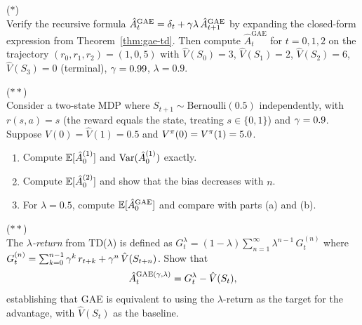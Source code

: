 \documentclass[11pt,a4paper]{article}
\begin{document}
\begin{exercise}
\textnormal{(\(*\))} \\
  Verify the recursive formula $\hat{A}_t^{\mathrm{GAE}} = \delta_t
  + \gamma\lambda\, \hat{A}_{t+1}^{\mathrm{GAE}}$ by expanding
  the closed-form expression from Theorem~\ref{thm:gae-td}. Then
  compute $\hat{A}_t^{\mathrm{GAE}}$ for $t = 0,1,2$ on the trajectory
  $(r_0, r_1, r_2) = (1, 0, 5)$ with $\hat{V}(S_0) = 3$,
  $\hat{V}(S_1) = 2$, $\hat{V}(S_2) = 6$, $\hat{V}(S_3) = 0$ (terminal),
  $\gamma = 0.99$, $\lambda = 0.9$.
\end{exercise}

\begin{exercise}
\textnormal{(\(**\))} \\
  Consider a two-state MDP where $S_{t+1} \sim
  \mathrm{Bernoulli}(0.5)$ independently, with $r(s, a) = s$ (the
  reward equals the state, treating $s \in \{0, 1\}$) and
  $\gamma = 0.9$. Suppose $\hat{V}(0) = \hat{V}(1) = 0.5$ and
  $V^{\pi}(0) = V^{\pi}(1) = 5.0$.
  \begin{enumerate}[label=(\alph*)]
    \item Compute $\mathbb{E}[\hat{A}_0^{(1)}]$ and $\operatorname{Var}(\hat{A}_0^{(1)})$
      exactly.
    \item Compute $\mathbb{E}[\hat{A}_0^{(2)}]$ and show that the bias decreases
      with $n$.
    \item For $\lambda = 0.5$, compute $\mathbb{E}[\hat{A}_0^{\mathrm{GAE}}]$
      and compare with parts (a) and (b).
  \end{enumerate}
\end{exercise}

\begin{exercise}
\textnormal{(\(**\))} \\
  The \emph{$\lambda$-return} from TD($\lambda$) is defined as
  $G_t^\lambda = (1-\lambda) \sum_{n=1}^{\infty} \lambda^{n-1}\,
  G_t^{(n)}$ where $G_t^{(n)} = \sum_{k=0}^{n-1} \gamma^k\,
  r_{t+k} + \gamma^n\, \hat{V}(S_{t+n})$. Show that
  \[
    \hat{A}_t^{\mathrm{GAE}(\gamma,\lambda)} = G_t^\lambda - \hat{V}(S_t),
  \]
  establishing that GAE is equivalent to using the $\lambda$-return as
  the target for the advantage, with $\hat{V}(S_t)$ as the baseline.
\end{exercise}
\end{document}

